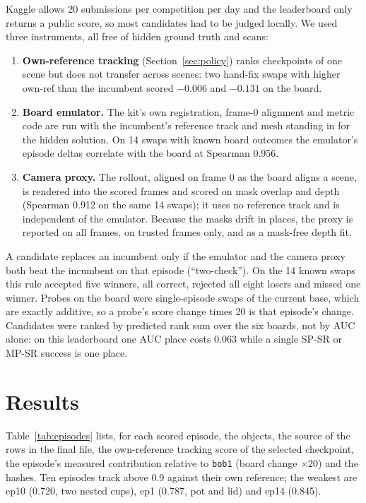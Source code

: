 \documentclass[10pt,a4paper]{article}
\newcommand{\code}[1]{\texttt{#1}}
\begin{document}
Kaggle allows 20 submissions per competition per day and the leaderboard only returns a public score, so most candidates had to be judged locally. We used three instruments, all free of hidden ground truth and scans:

\begin{enumerate}
\item \textbf{Own-reference tracking} (Section~\ref{sec:policy}) ranks checkpoints of one scene but does not transfer across scenes: two hand-fix swaps with higher own-ref than the incumbent scored $-0.006$ and $-0.131$ on the board.
\item \textbf{Board emulator.} The kit's own registration, frame-0 alignment and metric code are run with the incumbent's reference track and mesh standing in for the hidden solution. On 14 swaps with known board outcomes the emulator's episode deltas correlate with the board at Spearman 0.956.
\item \textbf{Camera proxy.} The rollout, aligned on frame 0 as the board aligns a scene, is rendered into the scored frames and scored on mask overlap and depth (Spearman 0.912 on the same 14 swaps); it uses no reference track and is independent of the emulator. Because the masks drift in places, the proxy is reported on all frames, on trusted frames only, and as a mask-free depth fit.
\end{enumerate}

A candidate replaces an incumbent only if the emulator and the camera proxy both beat the incumbent on that episode (``two-check''). On the 14 known swaps this rule accepted five winners, all correct, rejected all eight losers and missed one winner. Probes on the board were single-episode swaps of the current base, which are exactly additive, so a probe's score change times 20 is that episode's change. Candidates were ranked by predicted rank sum over the six boards, not by AUC alone: on this leaderboard one AUC place costs 0.063 while a single SP-SR or MP-SR success is one place.

\section{Results}
\label{sec:results}

Table~\ref{tab:episodes} lists, for each scored episode, the objects, the source of the rows in the final file, the own-reference tracking score of the selected checkpoint, the episode's measured contribution relative to \code{bob1} (board change $\times$20) and the hashes. Ten episodes track above 0.9 against their own reference; the weakest are ep10 (0.720, two nested cups), ep1 (0.787, pot and lid) and ep14 (0.845).
\end{document}
